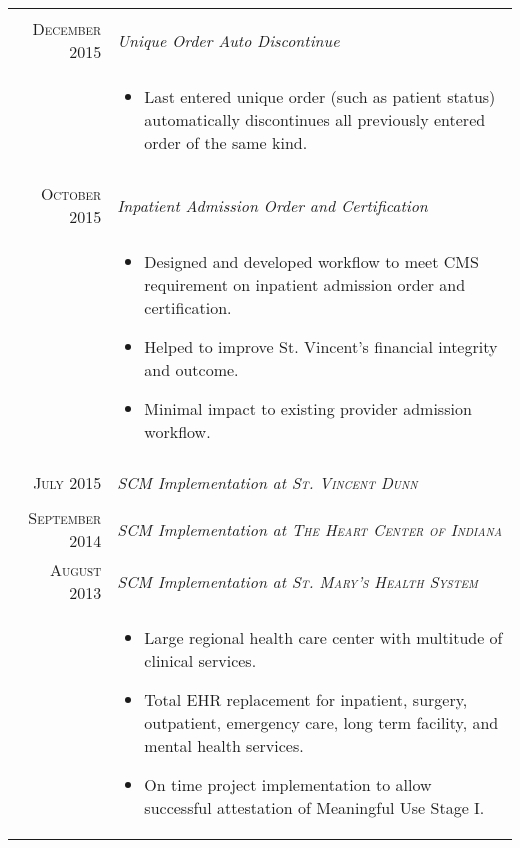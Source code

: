 \documentclass[letter,11pt,DIV=20]{scrartcl}
\begin{document}
\begin{tabu}{r|X}
\\\textsc{December 2015} & \emph{Unique Order Auto Discontinue} 
\\ &{\small\vspace{-0.5em} 
\begin{itemize}[nosep,leftmargin=1em]
     \item Last entered unique order (such as patient status) automatically discontinues all previously entered order of the same kind.
\end{itemize}} \\  
\\\textsc{October 2015} & \emph{Inpatient Admission Order and Certification} 
\\ &{\small\vspace{-0.5em} 
\begin{itemize}[nosep,leftmargin=1em]
     \item Designed and developed workflow to meet CMS requirement on inpatient admission order and certification.
     \item Helped to improve St. Vincent's financial integrity and outcome.
     \item Minimal impact to existing provider admission workflow.
\end{itemize}} \\  
\\ \textsc{July 2015} & \emph{SCM Implementation at \textsc{St. Vincent Dunn}}\\  
\\ \textsc{September 2014} & \emph{SCM Implementation at \textsc{The Heart Center of Indiana}}
\\ \textsc{August 2013} & \emph{SCM Implementation at \textsc{St. Mary's Health System}}
\\ &{\small\vspace{-0.5em} 
\begin{itemize}[nosep,leftmargin=1em]
     \item Large regional health care center with multitude of clinical services.
     \item Total EHR replacement for inpatient, surgery, outpatient, emergency care, long term facility, and mental health services.
     \item On time project implementation to allow successful attestation of Meaningful Use Stage I.
\end{itemize}}
\end{tabu}
\end{document}
